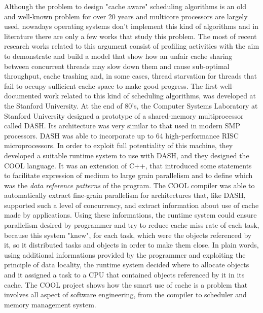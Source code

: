 Although the problem to design "cache aware" scheduling algorithms is an old and well-known problem for over 20 years and multicore processors are 
largely used, nowadays operating systems don't implement this kind of algorithms and in literature there are only a few works that study this problem. 
The most of recent research works related to this argument consist of profiling activities with the aim to demonstrate and build a model that show how
an unfair cache sharing between concurrent threads may slow down them and cause sub-optimal throughput, cache trashing and, in some cases, thread 
starvation for threads that fail to occupy sufficient cache space to make good progress.
The first well-documented work related to this kind of scheduling algorithms, was developed at the Stanford University.
At the end of 80's, the Computer Systems Laboratory at Stanford University designed a prototype of a shared-memory multiprocessor called DASH. 
Its architecture was very similar to that used in modern SMP processors. DASH was able to incorporate up to 64 high-performance RISC microprocessors. 
In order to exploit full potentiality of this machine, they developed a suitable
runtime system to use with DASH, and they designed the COOL language. 
It was an extension of C++, that introduced some statements to facilitate expression of medium to large grain parallelism and to define which was the 
\textit{data reference patterns} of the program.
The COOL compiler was able to automatically extract fine-grain parallelism for architectures that, like DASH, supported such a level of concurrency,
and extract information about use of cache made by applications. Using these informations, the runtime system could ensure parallelism desired by 
programmer and try to reduce cache miss rate of each task, because this system "knew", for each task, which were the objects referenced by it, so 
it distributed tasks and objects in order to make them close.
In plain words, using additional informations provided by the programmer and exploiting the principle of data locality, the runtime system decided where to 
allocate objects and it assigned a task to a CPU that contained objects referenced by it in its cache. The COOL project shows how the smart use of cache 
is a problem that involves all aspect of software engineering, from the compiler to scheduler and memory management system.

